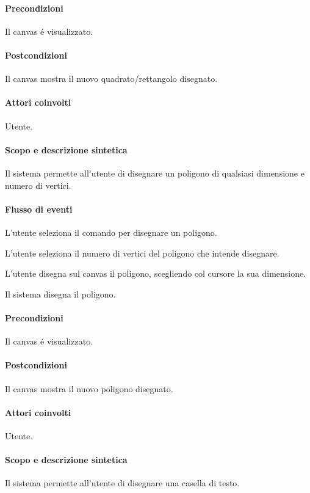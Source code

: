 \paragraph{Precondizioni} Il canvas \'e visualizzato.
\paragraph{Postcondizioni} Il canvas mostra il nuovo quadrato/rettangolo disegnato.

\paragraph{Attori coinvolti} Utente.
\paragraph{Scopo e descrizione sintetica} 
Il sistema permette all'utente di disegnare un poligono di qualsiasi dimensione e numero di vertici.
\paragraph{Flusso di eventi}
\begin{elenconumerato}[\textbf{}]{\subsubsecindent}
\item L'utente seleziona il comando per disegnare un poligono.
\item L'utente seleziona il numero di vertici del poligono che intende disegnare.
\item L'utente disegna sul canvas il poligono, scegliendo col cursore la sua dimensione.
\item Il sistema disegna il poligono.
\end{elenconumerato}
\paragraph{Precondizioni} Il canvas \'e visualizzato.
\paragraph{Postcondizioni} Il canvas mostra il nuovo poligono disegnato.

\paragraph{Attori coinvolti} Utente.
\paragraph{Scopo e descrizione sintetica} 
Il sistema permette all'utente di disegnare una casella di testo.
